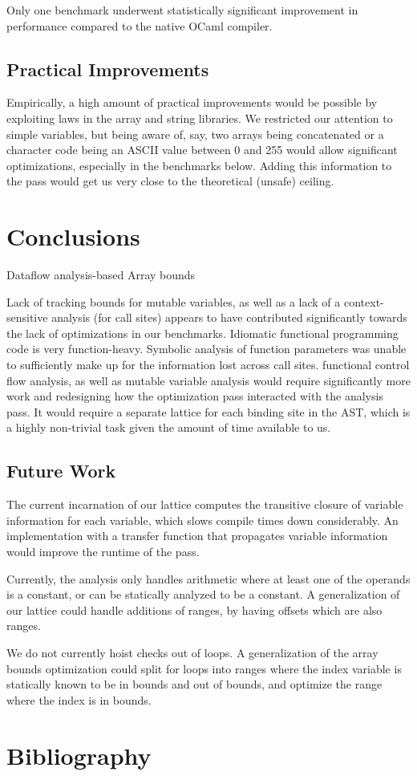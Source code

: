 \documentclass[11pt]{article}
\begin{document}
Only one benchmark underwent statistically significant improvement in performance compared to the native OCaml compiler.

\subsection{Practical Improvements}

Empirically, a high amount of practical improvements would be possible by exploiting laws in the array and string libraries. We restricted our attention to simple variables, but being aware of, say, two arrays being concatenated or a character code being an ASCII value between 0 and 255 would allow significant optimizations, especially in the benchmarks below. Adding this information to the pass would get us very close to the theoretical (unsafe) ceiling.

\section{Conclusions}

Dataflow analysis-based Array bounds

Lack of tracking bounds for mutable variables, as well as a lack of a context-sensitive analysis (for call sites) appears to have contributed significantly towards the lack of optimizations in our benchmarks.
Idiomatic functional programming code is very function-heavy. Symbolic analysis of function parameters was unable to sufficiently make up for the information lost across call sites. functional control flow analysis, as well as mutable variable analysis would require significantly more work and redesigning how the optimization pass interacted with the analysis pass. It would require a separate lattice for each binding site in the AST, which is a highly non-trivial task given the amount of time available to us.

\subsection{Future Work}

The current incarnation of our lattice computes the transitive closure of
variable information for each variable, which slows compile times down considerably.
An implementation with a transfer function that propagates variable information would
improve the runtime of the pass.

Currently, the analysis only handles arithmetic where at least one of the operands is
a constant, or can be statically analyzed to be a constant. A generalization of our
lattice could handle additions of ranges, by having offsets which are also ranges.

We do not currently hoist checks out of loops. A generalization of the array bounds optimization
could split for loops into ranges where the index variable is statically known to be in bounds and
out of bounds, and optimize the range where the index is in bounds.

\section{Bibliography}

\printbibliography
\end{document}
